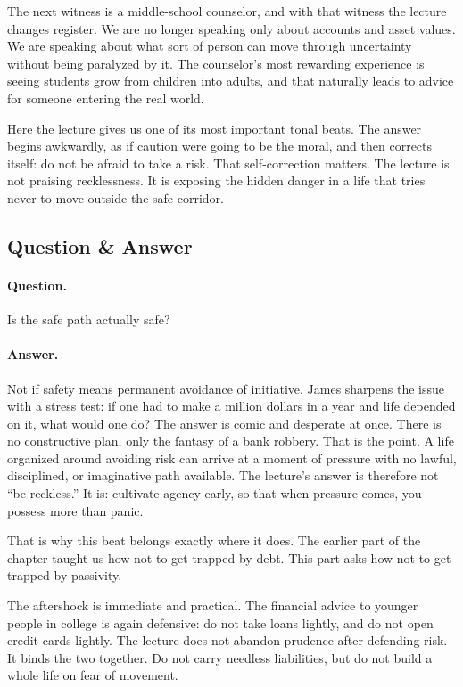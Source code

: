 The next witness is a middle-school counselor, and with that witness the lecture changes register. We are no longer speaking only about accounts and asset values. We are speaking about what sort of person can move through uncertainty without being paralyzed by it. The counselor's most rewarding experience is seeing students grow from children into adults, and that naturally leads to advice for someone entering the real world.

Here the lecture gives us one of its most important tonal beats. The answer begins awkwardly, as if caution were going to be the moral, and then corrects itself: do not be afraid to take a risk. That self-correction matters. The lecture is not praising recklessness. It is exposing the hidden danger in a life that tries never to move outside the safe corridor.

\subsection{Question \& Answer}

\paragraph{Question.}
Is the safe path actually safe?

\paragraph{Answer.}
Not if safety means permanent avoidance of initiative. James sharpens the issue with a stress test: if one had to make a million dollars in a year and life depended on it, what would one do? The answer is comic and desperate at once. There is no constructive plan, only the fantasy of a bank robbery. That is the point. A life organized around avoiding risk can arrive at a moment of pressure with no lawful, disciplined, or imaginative path available. The lecture's answer is therefore not ``be reckless.'' It is: cultivate agency early, so that when pressure comes, you possess more than panic.

That is why this beat belongs exactly where it does. The earlier part of the chapter taught us how not to get trapped by debt. This part asks how not to get trapped by passivity.

The aftershock is immediate and practical. The financial advice to younger people in college is again defensive: do not take loans lightly, and do not open credit cards lightly. The lecture does not abandon prudence after defending risk. It binds the two together. Do not carry needless liabilities, but do not build a whole life on fear of movement.

